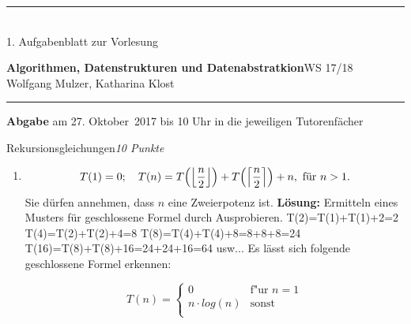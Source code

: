 \documentclass[a4paper,twoside,12pt]{article}
\newcommand{\ZETTELNUMMER}{1}
\newcommand{\ABGABEDATUM}{am 27. Oktober~2017 bis 10 Uhr in die 
  jeweiligen Tutorenf\"acher}
\newcounter{AUFGNR}
\newcommand{\AUFGABE}[2]{\vspace{0.3cm}\item[Aufgabe \arabic{AUFGNR}]\stepcounter{AUFGNR} #1\hfill\emph{#2}}
\begin{document}
\pagestyle{empty}
\hrule\medskip
\rule{0ex}{0ex}\\[-1ex]
\ZETTELNUMMER. Aufgabenblatt zur Vorlesung

\smallskip
\noindent
\large
\textbf{Algorithmen, Datenstrukturen und Datenabstratkion}\hfill WS 17/18 \\[0.5ex]
\normalsize
Wolfgang Mulzer, Katharina Klost

\medskip\hrule

\smallskip
\noindent
\textbf{Abgabe} \ABGABEDATUM

\vskip 0.5cm

\begin{description}

\AUFGABE{Rekursionsgleichungen}{10 Punkte}

\begin{enumerate}
  \item
    \[
       T(1) = 0; \quad T(n) = 
       T\Bigl(\left\lfloor \frac{n}{2}\right\rfloor\Bigr) +
                 T\Bigl(\left\lceil \frac{n}{2} \right\rceil\Bigr) + n, 
		 \text{ f\"ur } n > 1.
    \]
    Sie d\"urfen annehmen, dass $n$ eine Zweierpotenz ist.
\newline    
\newline  
\textbf{L\"osung:}
\newline  Ermitteln eines Musters f\"ur geschlossene Formel durch Ausprobieren.
\newline T(2)=T(1)+T(1)+2=2
\newline T(4)=T(2)+T(2)+4=8
\newline T(8)=T(4)+T(4)+8=8+8+8=24
\newline T(16)=T(8)+T(8)+16=24+24+16=64
\newline usw...
\newline
\newline Es l\"asst sich folgende geschlossene Formel erkennen: 

\begin{equation*}
   T(n) =
   \begin{cases}
     0 & \text{f"ur } n=1 \\
     n \cdot log(n) & \text{sonst} \\
   \end{cases}
\end{equation*}


\end{enumerate}
\end{description}
\end{document}
